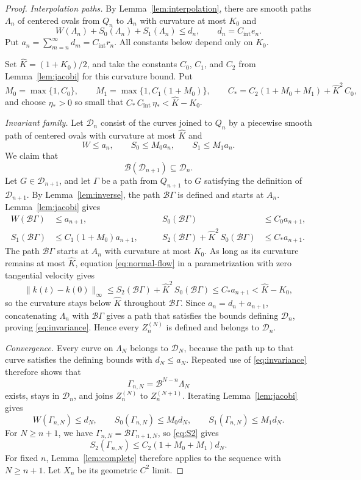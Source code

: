 \documentclass[11pt]{article}
\numberwithin{equation}{section}
\newcommand{\Bmap}{\mathcal B}
\newcommand{\norm}[1]{\lVert #1\rVert}
\begin{document}
\begin{proof}
\emph{Interpolation paths.}
By Lemma~\ref{lem:interpolation}, there are smooth paths \(\Lambda_n\) of
centered ovals from \(Q_n\) to \(A_n\) with curvature at most \(K_0\) and
\[
  W(\Lambda_n)+S_0(\Lambda_n)+S_1(\Lambda_n)\leq d_n,
  \qquad d_n=C_{\mathrm{int}}e_n.
\]
Put \(a_n=\sum_{m=n}^\infty d_m=C_{\mathrm{int}}r_n\). All constants below
depend only on \(K_0\).

Set \(\widehat K=(1+K_0)/2\), and take the constants
\(C_0\), \(C_1\), and \(C_2\) from Lemma~\ref{lem:jacobi} for this curvature bound. Put
\[
  M_0=\max\{1,C_0\},\qquad
  M_1=\max\{1,C_1(1+M_0)\},\qquad
  C_*=C_2(1+M_0+M_1)+\widehat K^2\,C_0,
\]
and choose \(\eta_*>0\) so small that
\(C_*\,C_{\mathrm{int}}\,\eta_*<\widehat K-K_0\).

\emph{Invariant family.}
Let \(\mathcal D_n\) consist of the curves joined to \(Q_n\) by a
piecewise smooth path of centered ovals with curvature
at most \(\widehat K\) and
\[
  W\leq a_n,\qquad S_0\leq M_0a_n,\qquad S_1\leq M_1a_n.
\]
We claim that
\begin{equation}\label{eq:invariance}
  \Bmap(\mathcal D_{n+1})\subseteq\mathcal D_n.
\end{equation}
Let \(G\in\mathcal D_{n+1}\), and let \(\Gamma\) be a path from
\(Q_{n+1}\) to \(G\) satisfying the definition of \(\mathcal D_{n+1}\).
By Lemma~\ref{lem:inverse}, the path \(\Bmap\Gamma\) is defined and starts
at \(A_n\). Lemma~\ref{lem:jacobi} gives
\[
\begin{aligned}
  W(\Bmap\Gamma)&\leq a_{n+1},&\qquad
  S_0(\Bmap\Gamma)&\leq C_0a_{n+1},\\
  S_1(\Bmap\Gamma)&\leq C_1(1+M_0)a_{n+1},&\qquad
  S_2(\Bmap\Gamma)+\widehat K^2\,S_0(\Bmap\Gamma)&\leq C_*a_{n+1}.
\end{aligned}
\]
The path \(\Bmap\Gamma\) starts at \(A_n\) with curvature at most
\(K_0\). As long as its curvature remains at most \(\widehat K\),
equation \eqref{eq:normal-flow} in a parametrization with zero tangential
velocity gives
\[
  \norm{k(t)-k(0)}_\infty
  \leq S_2(\Bmap\Gamma)+\widehat K^2\,S_0(\Bmap\Gamma)
  \leq C_*a_{n+1}<\widehat K-K_0,
\]
so the curvature stays below \(\widehat K\) throughout \(\Bmap\Gamma\).
Since \(a_n=d_n+a_{n+1}\), concatenating \(\Lambda_n\) with \(\Bmap\Gamma\)
gives a path that satisfies the bounds defining \(\mathcal D_n\), proving
\eqref{eq:invariance}. Hence every \(Z_n^{(N)}\) is defined and belongs to
\(\mathcal D_n\).

\emph{Convergence.}
Every curve on \(\Lambda_N\) belongs to \(\mathcal D_N\), because the path
up to that curve satisfies the defining bounds with \(d_N\leq a_N\).
Repeated use of \eqref{eq:invariance} therefore shows that
\[
  \Gamma_{n,N}=\Bmap^{N-n}\Lambda_N
\]
exists, stays in \(\mathcal D_n\), and joins \(Z_n^{(N)}\) to
\(Z_n^{(N+1)}\). Iterating Lemma~\ref{lem:jacobi} gives
\[
  W(\Gamma_{n,N})\leq d_N,\qquad
  S_0(\Gamma_{n,N})\leq M_0d_N,\qquad
  S_1(\Gamma_{n,N})\leq M_1d_N.
\]
For \(N\geq n+1\), we have \(\Gamma_{n,N}=\Bmap\Gamma_{n+1,N}\), so
\eqref{eq:S2} gives
\[
  S_2(\Gamma_{n,N})\leq C_2(1+M_0+M_1)d_N.
\]
For fixed \(n\), Lemma~\ref{lem:complete} therefore applies to the sequence
with \(N\geq n+1\). Let \(X_n\) be its geometric \(C^2\) limit.


\end{proof}
\end{document}
